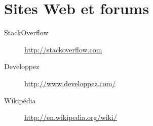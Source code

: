 \section{Sites Web et forums}
	\begin{description}
		\item[StackOverflow] \url{http://stackoverflow.com}
		\item[Developpez] \url{http://www.developpez.com/}
		\item[Wikipédia] \url{http://en.wikipedia.org/wiki/}
	\end{description}

